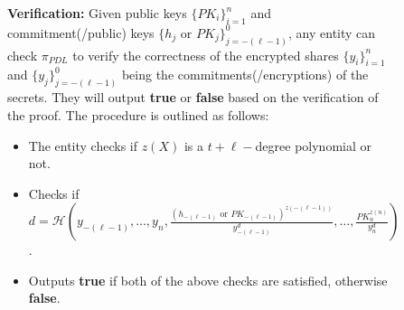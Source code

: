 \begin{figure}[H]
{\begin{tcolorbox}[title=\textbf{$\Lambda_{RO}^{'}$}, width=1.2\textwidth, colframe=blue!75!black, colback=blue!10, sharp corners]
        \vspace{0.5em}
        \textbf{Verification:}
            Given public keys $\{PK_i\}_{i=1}^n$ and commitment(/public) keys $\{h_j\text{ or }PK_j\}_{j=-(\ell-1)}^0$, any entity can check 
            $\pi_{PDL}$ to verify the correctness of the encrypted shares $\{y_i\}_{i=1}^n$ and $\{y_j\}_{j=-(\ell-1)}^0$ being the commitments(/encryptions) of the secrets. 
            They will output \textbf{true} or \textbf{false} based on the verification of the proof. The 
            procedure is outlined as follows:
        \begin{itemize}
            \item The entity checks if $z(X)$ is a $t+\ell-$degree polynomial or not.
            \item Checks if $d=\mathcal{H}(y_{-(\ell-1)},\dots,y_n,\frac{(h_{-(\ell-1)}\text{ or }PK_{-(\ell-1)})^{z(-(\ell-1))}}{y_{-(\ell-1)}^d},\dots,\frac{PK_n^{z(n)}}{y_n^d})$.
            \item Outputs \textbf{true} if both of the above checks are satisfied, otherwise \textbf{false}.
        \end{itemize}


\end{tcolorbox}}
\end{figure}
